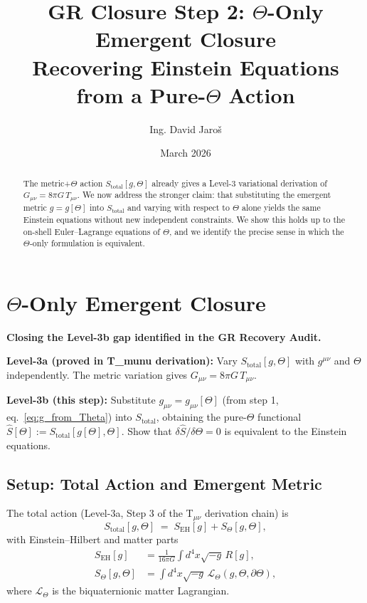 \documentclass[12pt]{article}
\title{\textbf{GR Closure Step 2: $\Theta$-Only Emergent Closure\\
         Recovering Einstein Equations from a Pure-$\Theta$ Action}}
\author{Ing. David Jaroš}
\date{March 2026}
\theoremstyle{definition}
\theoremstyle{remark}
\begin{document}
  \maketitle

  \begin{abstract}
  The metric+$\Theta$ action $S_{\text{total}}[g,\Theta]$ already gives a Level-3
  variational derivation of $G_{\mu\nu}=8\pi G\,T_{\mu\nu}$.  We now address the
  stronger claim: that substituting the emergent metric $g=g[\Theta]$ into
  $S_{\text{total}}$ and varying with respect to $\Theta$ alone yields the same
  Einstein equations without new independent constraints.  We show this holds up
  to the on-shell Euler--Lagrange equations of $\Theta$, and we identify the
  precise sense in which the $\Theta$-only formulation is equivalent.
  \end{abstract}
\fi

\section{$\Theta$-Only Emergent Closure}
\label{sec:theta_only_closure}

\begin{tcolorbox}[colback=blue!5!white,colframe=blue!75!black,title=Purpose of This Step]
\textbf{Closing the Level-3b gap identified in the GR Recovery Audit.}

\medskip
\noindent\textbf{Level-3a (proved in T\_munu derivation):}
Vary $S_{\text{total}}[g,\Theta]$ with $g^{\mu\nu}$ and $\Theta$ independently.
The metric variation gives $G_{\mu\nu}=8\pi G\,T_{\mu\nu}$.

\medskip
\noindent\textbf{Level-3b (this step):}
Substitute $g_{\mu\nu}=g_{\mu\nu}[\Theta]$ (from step 1, eq.~\eqref{eq:g_from_Theta})
into $S_{\text{total}}$, obtaining the pure-$\Theta$ functional
$\hat{S}[\Theta]:=S_{\text{total}}[g[\Theta],\Theta]$.  Show that
$\delta\hat{S}/\delta\Theta=0$ is equivalent to the Einstein equations.
\end{tcolorbox}

\subsection{Setup: Total Action and Emergent Metric}

The total action (Level-3a, Step 3 of the T$_{\mu\nu}$ derivation chain) is
\begin{equation}
  S_{\text{total}}[g,\Theta]
  \;=\; S_{\text{EH}}[g] + S_\Theta[g,\Theta],
  \label{eq:S_total}
\end{equation}
with Einstein--Hilbert and matter parts
\begin{align}
  S_{\text{EH}}[g]
  &= \frac{1}{16\pi G}\int d^4x\sqrt{-g}\,R[g], \\
  S_\Theta[g,\Theta]
  &= \int d^4x\sqrt{-g}\,\mathcal{L}_\Theta(g,\Theta,\partial\Theta),
\end{align}
where $\mathcal{L}_\Theta$ is the biquaternionic matter Lagrangian.
\end{document}
